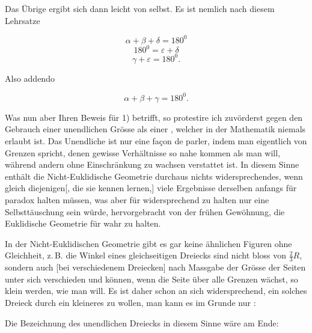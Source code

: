 

%
\noindent\begin{minipage}[t]{2.35cm}\vspace{0pt}

\end{minipage}\hfill\begin{minipage}[t]{9.9cm}\vspace{0pt}

 Das Übrige ergibt sich dann leicht von selbst. Es ist nemlich nach diesem Lehrsatze

\[
\alpha+\beta+\delta=180^0
\]
\[
180^0=\varepsilon+\delta
\]
\[
\gamma+\varepsilon=180^0.
\]

 Also addendo

\[
\alpha+\beta+\gamma=180^0.
\]

 \end{minipage}

Was nun aber Ihren Beweis für 1) betrifft, so protestire ich zuvörderst gegen den Gebrauch einer unendlichen Grösse als einer , welcher in der Mathematik niemals erlaubt ist. Das Unendliche ist nur eine façon de parler, indem man eigentlich von Grenzen spricht, denen gewisse Verhältnisse so nahe kommen als man will, während andern ohne Einschränkung zu wachsen verstattet ist. In diesem Sinne enthält die Nicht-Euklidische Geometrie durchaus nichts widersprechendes, wenn gleich diejenigen[, die sie kennen lernen,] viele Ergebnisse derselben anfangs für paradox halten müssen, was aber für widersprechend zu halten nur eine Selbsttäuschung sein würde, hervorgebracht von der frühen Gewöhnung, die Euklidische Geometrie für  wahr zu halten.

In der Nicht-Euklidischen Geometrie gibt es gar keine ähnlichen Figuren ohne Gleichheit, z.\,B. die Winkel eines gleichseitigen Dreiecks sind nicht bloss von $\frac{2}{3}R$, sondern auch [bei verschiedenem Dreiecken] nach Massgabe der Grösse der Seiten unter sich verschieden und können, wenn die Seite über alle Grenzen wächst, so klein werden, wie man will. Es ist daher schon an sich widersprechend, ein solches Dreieck durch ein kleineres  zu wollen, man kann es im Grunde nur :

\begin{center}

\end{center}

 Die Bezeichnung des unendlichen Dreiecks in diesem Sinne wäre am Ende:

\begin{center}

\end{center}
